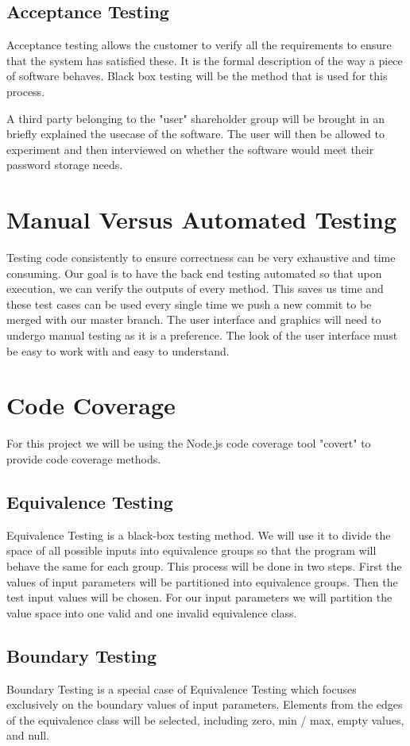 \documentclass[12pt]{article}
\begin{document}
\subsection{Acceptance Testing}
Acceptance testing allows the customer to verify all the requirements to ensure that the system has satisfied these. It is the formal description of the way a piece of software behaves. Black box testing will be the method that is used for this process. 

A third party belonging to the "user" shareholder group will be brought in an briefly explained the usecase of the software. The user will then be allowed to experiment and then interviewed on whether the software would meet their password storage needs.

\section{Manual Versus Automated Testing}
Testing code consistently to ensure correctness can be very exhaustive and time consuming. Our goal is to have the back end testing automated so that upon execution, we can verify the outputs of every method. This saves us time and these test cases can be used every single time we push a new commit to be merged with our master branch. The user interface and graphics will need to undergo manual testing as it is a preference. The look of the user interface must be easy to work with and easy to understand. 

\section{Code Coverage}
For this project we will be using the Node.js code coverage tool "covert" to provide code coverage methods.

\subsection{Equivalence Testing}
Equivalence Testing is a black-box testing method. We will use it to divide the space of all possible inputs into equivalence groups so that the program will behave the same for each group. This process will be done in two steps. First the values of input parameters will be partitioned into equivalence groups. Then the test input values will be chosen. For our input parameters we will partition the value space into one valid and one invalid equivalence class.

\subsection{Boundary Testing}
Boundary Testing is a special case of Equivalence Testing which focuses exclusively on the boundary values of input parameters. Elements from the edges of the equivalence class will be selected, including zero, min / max, empty values, and null.
\end{document}
